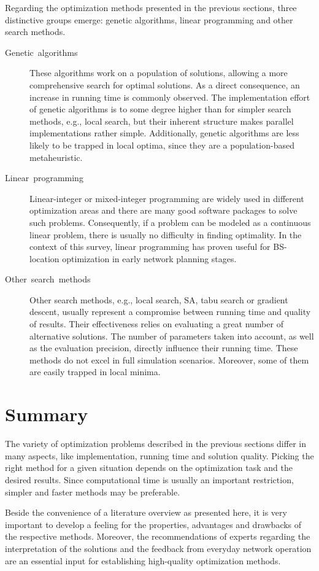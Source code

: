 Regarding the optimization methods presented in the previous sections,
three distinctive groups emerge: genetic algorithms, linear programming
and other search methods.
\begin{description}
\item [{Genetic~algorithms}] These algorithms work on a population of
solutions, allowing a more comprehensive search for optimal solutions.
As a direct consequence, an increase in running time is commonly observed.
The implementation effort of genetic algorithms is to some degree
higher than for simpler search methods, e.g., local search, but their
inherent structure makes parallel implementations rather simple. Additionally,
genetic algorithms are less likely to be trapped in local optima,
since they are a population-based metaheuristic.
\item [{Linear~programming}] Linear-integer or mixed-integer programming
are widely used in different optimization areas and there are many
good software packages to solve such problems. Consequently, if a
problem can be modeled as a continuous linear problem, there is usually
no difficulty in finding optimality. In the context of this survey,
linear programming has proven useful for BS-location optimization
in early network planning stages.
\item [{Other~search~methods}] Other search methods, e.g., local search,
SA, tabu search or gradient descent, usually represent a compromise
between running time and quality of results. Their effectiveness relies
on evaluating a great number of alternative solutions. The number
of parameters taken into account, as well as the evaluation precision,
directly influence their running time. These methods do not excel
in full simulation scenarios. Moreover, some of them are easily trapped
in local minima.
\end{description}

\section{Summary}

The variety of optimization problems described in the previous sections
differ in many aspects, like implementation, running time and solution
quality. Picking the right method for a given situation depends on
the optimization task and the desired results. Since computational
time is usually an important restriction, simpler and faster methods
may be preferable.

Beside the convenience of a literature overview as presented here,
it is very important to develop a feeling for the properties, advantages
and drawbacks of the respective methods. Moreover, the recommendations
of experts regarding the interpretation of the solutions and the feedback
from everyday network operation are an essential input for establishing
high-quality optimization methods.

